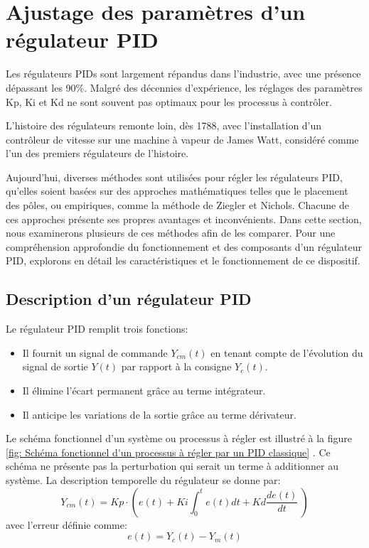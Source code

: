 \section{Ajustage des paramètres d'un régulateur PID}

Les régulateurs PIDs sont largement répandus dans l'industrie, avec une présence dépassant les 90\%. Malgré des décennies d'expérience, les réglages des paramètres Kp, Ki et Kd ne sont souvent pas optimaux pour les processus à contrôler. 

L'histoire des régulateurs remonte loin, dès 1788, avec l'installation d'un contrôleur de vitesse sur une machine à vapeur de James Watt, considéré comme l'un des premiers régulateurs de l'histoire.

Aujourd'hui, diverses méthodes sont utilisées pour régler les régulateurs PID, qu'elles soient basées sur des approches mathématiques telles que le placement des pôles, ou empiriques, comme la méthode de Ziegler et Nichols. Chacune de ces approches présente ses propres avantages et inconvénients. Dans cette section, nous examinerons plusieurs de ces méthodes afin de les comparer. Pour une compréhension approfondie du fonctionnement et des composants d'un régulateur PID, explorons en détail les caractéristiques et le fonctionnement de ce dispositif.\cite{EIVD}

\subsection{Description d'un régulateur PID}

Le régulateur PID remplit trois fonctions:
\begin{itemize}
	\item Il fournit un signal de commande $Y_{cm}(t)$ en tenant compte de l'évolution du signal de sortie $Y(t)$ par rapport à la consigne $Y_c(t)$.
	\item Il élimine l'écart permanent grâce au terme intégrateur.
	\item Il anticipe les variations de la sortie grâce au terme dérivateur.
\end{itemize}
Le schéma fonctionnel d'un système ou processus à régler est illustré à la figure \ref{fig: Schéma fonctionnel d'un processus à régler par un PID classique} . Ce schéma ne présente pas la perturbation qui serait un terme à additionner au système. La description temporelle du régulateur se donne par:
\begin{equation}
	Y_{cm}(t)=Kp\cdot  \left( e(t)+Ki\int_{0}^{t}e(t)dt+Kd\frac{de(t)}{dt} \ \right)
	\label{eq: PID temporel}
\end{equation}
avec l'erreur définie comme:
\begin{equation}
	e(t)=Y_c(t)-Y_m(t)
	\label{eq: erreur}
\end{equation}

